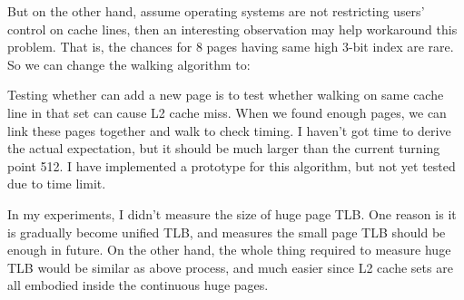 But on the other hand, assume operating systems are not restricting users'
control on cache lines, then an interesting observation may help workaround this
problem. That is, the chances for 8 pages having same high 3-bit index are rare.
So we can change the walking algorithm to:


Testing whether can add a new page is to test whether walking on same cache
line in that set can cause L2 cache miss. When we found enough pages, we can
link these pages together and walk to check timing. I haven't got time to
derive the actual expectation, but it should be much larger than the current
turning point 512. I have implemented a prototype for this algorithm, but not yet tested due to time limit. 

In my experiments, I didn't measure the size of huge page TLB. One reason is it
is gradually become unified TLB, and measures the small page TLB should be
enough in future.  On the other hand, the whole thing required to measure huge
TLB would be similar as above process, and much easier since L2 cache sets are
all embodied inside the continuous huge pages.

